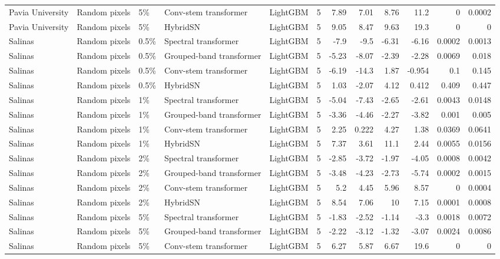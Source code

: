 \begin{table}
\begin{tabular}{lllllrrrrrrr}
Pavia University & Random pixels & 5\% & Conv-stem transformer & LightGBM & 5 & 7.89 & 7.01 & 8.76 & 11.2 & 0 & 0.0002 \\
Pavia University & Random pixels & 5\% & HybridSN & LightGBM & 5 & 9.05 & 8.47 & 9.63 & 19.3 & 0 & 0 \\
Salinas & Random pixels & 0.5\% & Spectral transformer & LightGBM & 5 & -7.9 & -9.5 & -6.31 & -6.16 & 0.0002 & 0.0013 \\
Salinas & Random pixels & 0.5\% & Grouped-band transformer & LightGBM & 5 & -5.23 & -8.07 & -2.39 & -2.28 & 0.0069 & 0.018 \\
Salinas & Random pixels & 0.5\% & Conv-stem transformer & LightGBM & 5 & -6.19 & -14.3 & 1.87 & -0.954 & 0.1 & 0.145 \\
Salinas & Random pixels & 0.5\% & HybridSN & LightGBM & 5 & 1.03 & -2.07 & 4.12 & 0.412 & 0.409 & 0.447 \\
Salinas & Random pixels & 1\% & Spectral transformer & LightGBM & 5 & -5.04 & -7.43 & -2.65 & -2.61 & 0.0043 & 0.0148 \\
Salinas & Random pixels & 1\% & Grouped-band transformer & LightGBM & 5 & -3.36 & -4.46 & -2.27 & -3.82 & 0.001 & 0.005 \\
Salinas & Random pixels & 1\% & Conv-stem transformer & LightGBM & 5 & 2.25 & 0.222 & 4.27 & 1.38 & 0.0369 & 0.0641 \\
Salinas & Random pixels & 1\% & HybridSN & LightGBM & 5 & 7.37 & 3.61 & 11.1 & 2.44 & 0.0055 & 0.0156 \\
Salinas & Random pixels & 2\% & Spectral transformer & LightGBM & 5 & -2.85 & -3.72 & -1.97 & -4.05 & 0.0008 & 0.0042 \\
Salinas & Random pixels & 2\% & Grouped-band transformer & LightGBM & 5 & -3.48 & -4.23 & -2.73 & -5.74 & 0.0002 & 0.0015 \\
Salinas & Random pixels & 2\% & Conv-stem transformer & LightGBM & 5 & 5.2 & 4.45 & 5.96 & 8.57 & 0 & 0.0004 \\
Salinas & Random pixels & 2\% & HybridSN & LightGBM & 5 & 8.54 & 7.06 & 10 & 7.15 & 0.0001 & 0.0008 \\
Salinas & Random pixels & 5\% & Spectral transformer & LightGBM & 5 & -1.83 & -2.52 & -1.14 & -3.3 & 0.0018 & 0.0072 \\
Salinas & Random pixels & 5\% & Grouped-band transformer & LightGBM & 5 & -2.22 & -3.12 & -1.32 & -3.07 & 0.0024 & 0.0086 \\
Salinas & Random pixels & 5\% & Conv-stem transformer & LightGBM & 5 & 6.27 & 5.87 & 6.67 & 19.6 & 0 & 0 \\

\end{tabular}
\end{table}
